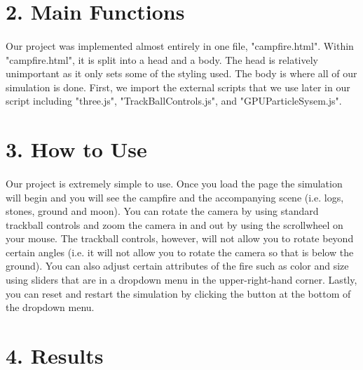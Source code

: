 \documentclass[letterpaper]{article}
\begin{document}
\section*{2. Main Functions}

\paragraph{}
    Our project was implemented almost entirely in one file, "campfire.html". Within "campfire.html", it is split into a head and a body. The head is relatively unimportant as it only sets some of the styling used. The body is where all of our simulation is done. First, we import the external scripts that we use later in our script including "three.js", "TrackBallControls.js", and "GPUParticleSysem.js".



\section*{3. How to Use}

\paragraph{}
    Our project is extremely simple to use. Once you load the page the simulation will begin and you will see the campfire and the accompanying scene (i.e. logs, stones, ground and moon). You can rotate the camera by using standard trackball controls and zoom the camera in and out by using the scrollwheel on your mouse. The trackball controls, however, will not allow you to rotate beyond certain angles (i.e. it will not allow you to rotate the camera so that is below the ground). You can also adjust certain attributes of the fire such as color and size using sliders that are in a dropdown menu in the upper-right-hand corner. Lastly, you can reset and restart the simulation by clicking the button at the bottom of the dropdown menu.

\section*{4. Results}
\end{document}
